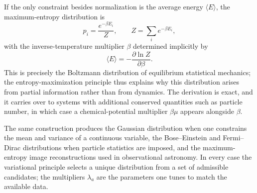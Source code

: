 \begin{example}
If the only constraint besides normalization is the average energy $\langle E\rangle$, the maximum-entropy distribution is
\begin{equation}
p_i=\frac{e^{-\beta E_i}}{Z},
\qquad
Z=\sum_i e^{-\beta E_i},
\end{equation}
with the inverse-temperature multiplier $\beta$ determined implicitly by
\begin{equation}
\langle E\rangle=-\frac{\partial\ln Z}{\partial\beta}.
\end{equation}
This is precisely the Boltzmann distribution of equilibrium statistical mechanics; the entropy-maximization principle thus explains why this distribution arises from partial information rather than from dynamics. The derivation is exact, and it carries over to systems with additional conserved quantities such as particle number, in which case a chemical-potential multiplier $\beta\mu$ appears alongside $\beta$.
\end{example}

The same construction produces the Gaussian distribution when one constrains the mean and variance of a continuous variable, the Bose--Einstein and Fermi--Dirac distributions when particle statistics are imposed, and the maximum-entropy image reconstructions used in observational astronomy. In every case the variational principle selects a unique distribution from a set of admissible candidates; the multipliers $\lambda_a$ are the parameters one tunes to match the available data.